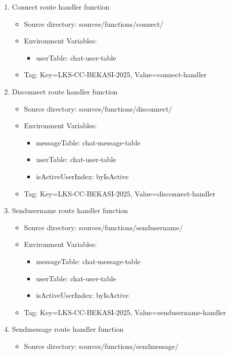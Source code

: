 \documentclass{article}
\begin{document}
\begin{enumerate}
\begin{enumerate}
    \item Connect route handler function
    \begin{itemize}
      \item Source directory: sources/functions/connect/
      \item Environment Variables:
      \begin{itemize}
        \item userTable: chat-user-table
      \end{itemize}
      \item Tag: Key=LKS-CC-BEKASI-2025, Value=connect-handler
    \end{itemize}
    \item Disconnect route handler function
    \begin{itemize}
      \item Source directory: sources/functions/disconnect/ 
      \item Environment Variables:
      \begin{itemize}
        \item messageTable: chat-message-table
        \item userTable: chat-user-table
        \item isActiveUserIndex: byIsActive
      \end{itemize}
      \item Tag: Key=LKS-CC-BEKASI-2025, Value=disconnect-handler
    \end{itemize}
    \item Sendusername route handler function
    \begin{itemize}
      \item Source directory: sources/functions/sendusername/
      \item Environment Variables:
      \begin{itemize}
        \item messageTable: chat-message-table
        \item userTable: chat-user-table
        \item isActiveUserIndex: byIsActive
      \end{itemize}
      \item Tag: Key=LKS-CC-BEKASI-2025, Value=sendusername-handler
    \end{itemize}
    \item Sendmessage route handler function
    \begin{itemize}
      \item Source directory: sources/functions/sendmessage/

\end{itemize}
\end{enumerate}
\end{enumerate}
\end{document}
